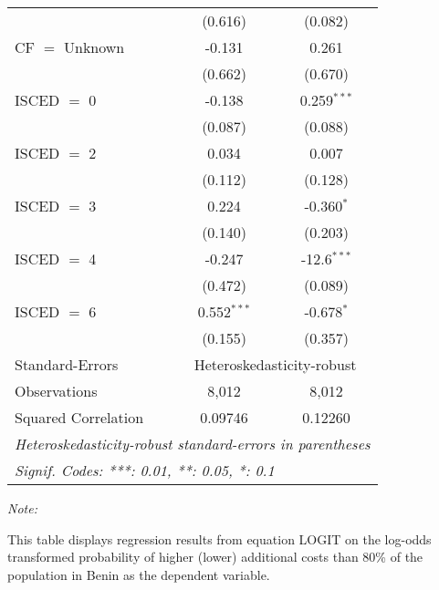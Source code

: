 \begin{table}[htbp!]
\begin{adjustbox}{width = 1\textwidth, max height = 0.95\textheight, center}
\begin{threeparttable}[b]
\begin{tabular}{lcc}
                                 & (0.616)       & (0.082)\\   
            CF $=$ Unknown       & -0.131        & 0.261\\   
                                 & (0.662)       & (0.670)\\   
            ISCED $=$ 0          & -0.138        & 0.259$^{***}$\\   
                                 & (0.087)       & (0.088)\\   
            ISCED $=$ 2          & 0.034         & 0.007\\   
                                 & (0.112)       & (0.128)\\   
            ISCED $=$ 3          & 0.224         & -0.360$^{*}$\\   
                                 & (0.140)       & (0.203)\\   
            ISCED $=$ 4          & -0.247        & -12.6$^{***}$\\   
                                 & (0.472)       & (0.089)\\   
            ISCED $=$ 6          & 0.552$^{***}$ & -0.678$^{*}$\\   
                                 & (0.155)       & (0.357)\\   
            \midrule 
            Standard-Errors & \multicolumn{2}{c}{Heteroskedasticity-robust} \\ 
            Observations         & 8,012         & 8,012\\  
            Squared Correlation  & 0.09746       & 0.12260\\  
            \midrule \midrule
            \multicolumn{3}{l}{\emph{Heteroskedasticity-robust standard-errors in parentheses}}\\
            \multicolumn{3}{l}{\emph{Signif. Codes: ***: 0.01, **: 0.05, *: 0.1}}\\
         \end{tabular}
         
         \begin{tablenotes}\item \medskip \textit{Note:}
            \item This table displays regression results from equation LOGIT on the log-odds transformed probability of higher (lower) additional costs than 80\% of the population in Benin as the dependent variable. 
         \end{tablenotes}
      \end{threeparttable}
   \end{adjustbox}
\end{table}


